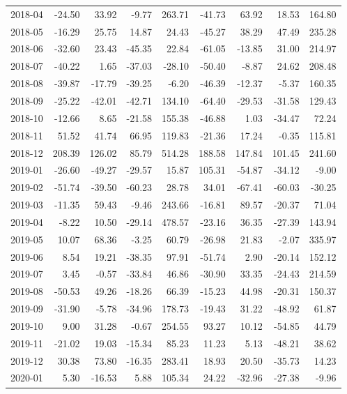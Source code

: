 \begin{table}[ht]
\begin{tabular}{lrrrrrrrr}
  2018-04 & -24.50 & 33.92 & -9.77 & 263.71 & -41.73 & 63.92 & 18.53 & 164.80 \\ 
  2018-05 & -16.29 & 25.75 & 14.87 & 24.43 & -45.27 & 38.29 & 47.49 & 235.28 \\ 
  2018-06 & -32.60 & 23.43 & -45.35 & 22.84 & -61.05 & -13.85 & 31.00 & 214.97 \\ 
  2018-07 & -40.22 & 1.65 & -37.03 & -28.10 & -50.40 & -8.87 & 24.62 & 208.48 \\ 
  2018-08 & -39.87 & -17.79 & -39.25 & -6.20 & -46.39 & -12.37 & -5.37 & 160.35 \\ 
  2018-09 & -25.22 & -42.01 & -42.71 & 134.10 & -64.40 & -29.53 & -31.58 & 129.43 \\ 
  2018-10 & -12.66 & 8.65 & -21.58 & 155.38 & -46.88 & 1.03 & -34.47 & 72.24 \\ 
  2018-11 & 51.52 & 41.74 & 66.95 & 119.83 & -21.36 & 17.24 & -0.35 & 115.81 \\ 
  2018-12 & 208.39 & 126.02 & 85.79 & 514.28 & 188.58 & 147.84 & 101.45 & 241.60 \\ 
  2019-01 & -26.60 & -49.27 & -29.57 & 15.87 & 105.31 & -54.87 & -34.12 & -9.00 \\ 
  2019-02 & -51.74 & -39.50 & -60.23 & 28.78 & 34.01 & -67.41 & -60.03 & -30.25 \\ 
  2019-03 & -11.35 & 59.43 & -9.46 & 243.66 & -16.81 & 89.57 & -20.37 & 71.04 \\ 
  2019-04 & -8.22 & 10.50 & -29.14 & 478.57 & -23.16 & 36.35 & -27.39 & 143.94 \\ 
  2019-05 & 10.07 & 68.36 & -3.25 & 60.79 & -26.98 & 21.83 & -2.07 & 335.97 \\ 
  2019-06 & 8.54 & 19.21 & -38.35 & 97.91 & -51.74 & 2.90 & -20.14 & 152.12 \\ 
  2019-07 & 3.45 & -0.57 & -33.84 & 46.86 & -30.90 & 33.35 & -24.43 & 214.59 \\ 
  2019-08 & -50.53 & 49.26 & -18.26 & 66.39 & -15.23 & 44.98 & -20.31 & 150.37 \\ 
  2019-09 & -31.90 & -5.78 & -34.96 & 178.73 & -19.43 & 31.22 & -48.92 & 61.87 \\ 
  2019-10 & 9.00 & 31.28 & -0.67 & 254.55 & 93.27 & 10.12 & -54.85 & 44.79 \\ 
  2019-11 & -21.02 & 19.03 & -15.34 & 85.23 & 11.23 & 5.13 & -48.21 & 38.62 \\ 
  2019-12 & 30.38 & 73.80 & -16.35 & 283.41 & 18.93 & 20.50 & -35.73 & 14.23 \\ 
  2020-01 & 5.30 & -16.53 & 5.88 & 105.34 & 24.22 & -32.96 & -27.38 & -9.96 \\ 

\end{tabular}
\end{table}
